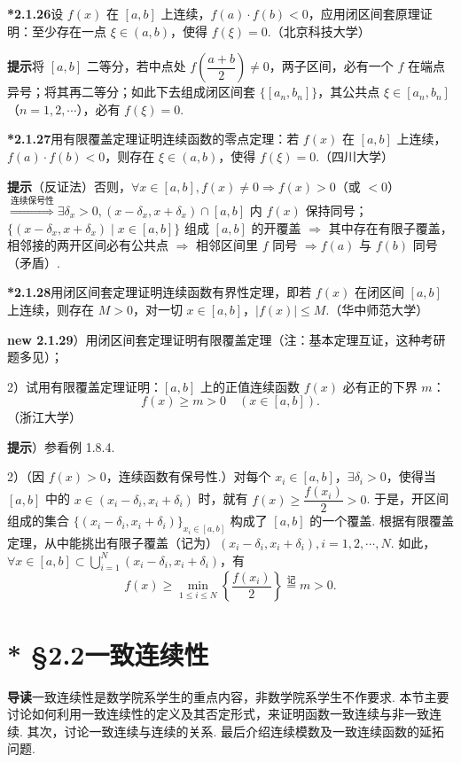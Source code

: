 \documentclass[UTF8, 12pt, fontset=fandol, oneside]{ctexart}
\begin{document}
\noindent\textbf{*2.1.26}\quad 设 $f(x)$ 在 $[a,b]$ 上连续，$f(a)\cdot f(b)<0$，应用闭区间套原理证明：至少存在一点 $\xi\in(a,b)$，使得 $f(\xi)=0$.（北京科技大学）

\noindent\textbf{提示}\quad 将 $[a,b]$ 二等分，若中点处 $f\left(\dfrac{a+b}{2}\right)\ne0$，两子区间，必有一个 $f$ 在端点异号；将其再二等分；如此下去组成闭区间套 $\{[a_n,b_n]\}$，其公共点 $\xi\in[a_n,b_n]$（$n=1,2,\cdots$），必有 $f(\xi)=0$.

\noindent\textbf{*2.1.27}\quad 用有限覆盖定理证明连续函数的零点定理：若 $f(x)$ 在 $[a,b]$ 上连续，$f(a)\cdot f(b)<0$，则存在 $\xi\in(a,b)$，使得 $f(\xi)=0$.（四川大学）

\noindent\textbf{提示}\quad （反证法）否则，$\forall x\in[a,b],f(x)\ne0\Rightarrow f(x)>0$（或 $<0$）$\overset{\text{连续保号性}}{\Longrightarrow}\exists\delta_x>0,(x-\delta_x,x+\delta_x)\cap[a,b]$ 内 $f(x)$ 保持同号；$\{(x-\delta_x,x+\delta_x)\mid x\in[a,b]\}$ 组成 $[a,b]$ 的开覆盖 $\Rightarrow$ 其中存在有限子覆盖，相邻接的两开区间必有公共点 $\Rightarrow$ 相邻区间里 $f$ 同号 $\Rightarrow f(a)$ 与 $f(b)$ 同号（矛盾）.

\noindent\textbf{*2.1.28}\quad 用闭区间套定理证明连续函数有界性定理，即若 $f(x)$ 在闭区间 $[a,b]$ 上连续，则存在 $M>0$，对一切 $x\in[a,b]$，$|f(x)|\le M$.（华中师范大学）

\noindent\textbf{new 2.1.29}）用闭区间套定理证明有限覆盖定理（注：基本定理互证，这种考研题多见）；

2）试用有限覆盖定理证明：$[a,b]$ 上的正值连续函数 $f(x)$ 必有正的下界 $m$：
\[
  f(x)\ge m>0\quad(x\in[a,b]).
\]
（浙江大学）

\noindent\textbf{提示}）参看例 1.8.4.

2）（因 $f(x)>0$，连续函数有保号性.）对每个 $x_i\in[a,b]$，$\exists\delta_i>0$，使得当 $[a,b]$ 中的 $x\in(x_i-\delta_i,x_i+\delta_i)$ 时，就有 $f(x)\ge\dfrac{f(x_i)}2>0$. 于是，开区间组成的集合 $\{(x_i-\delta_i,x_i+\delta_i)\}_{x_i\in[a,b]}$ 构成了 $[a,b]$ 的一个覆盖. 根据有限覆盖定理，从中能挑出有限子覆盖（记为）$(x_i-\delta_i,x_i+\delta_i),i=1,2,\cdots,N$. 如此，$\forall x\in[a,b]\subset\bigcup\limits_{i=1}^{N}(x_i-\delta_i,x_i+\delta_i)$，有
\[
  f(x)\ge\min_{1\le i\le N}\left\{\frac{f(x_i)}2\right\}\overset{\text{记}}=m>0.
\]

\section*{* §2.2\quad 一致连续性}

\noindent\textbf{导读}\quad 一致连续性是数学院系学生的重点内容，非数学院系学生不作要求. 本节主要讨论如何利用一致连续性的定义及其否定形式，来证明函数一致连续与非一致连续. 其次，讨论一致连续与连续的关系. 最后介绍连续模数及一致连续函数的延拓问题.
\end{document}
